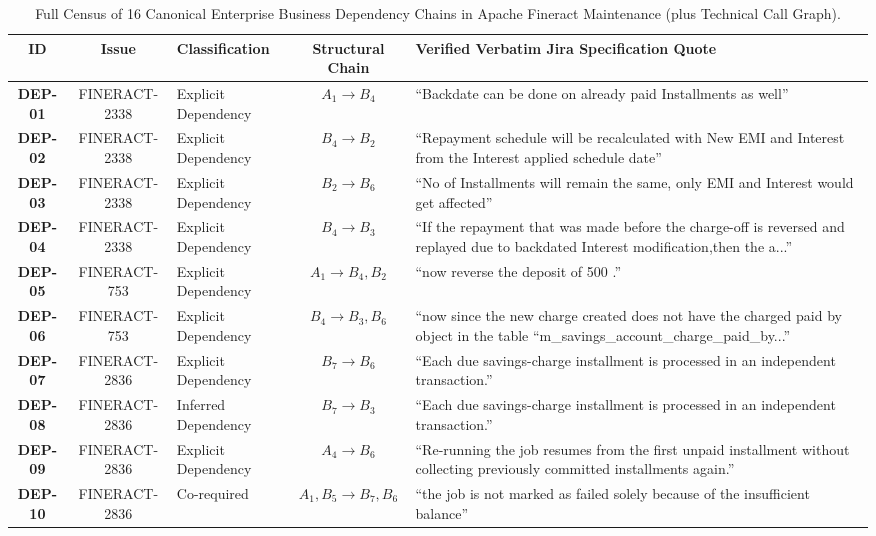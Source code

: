 \begin{table}[t]
\centering
\footnotesize
\caption{Full Census of 16 Canonical Enterprise Business Dependency Chains in Apache Fineract Maintenance (plus Technical Call Graph).}
\label{tab:fineract_dependencies_full}
\begin{tabularx}{\textwidth}{c c l c X}
\toprule
\textbf{ID} & \textbf{Issue} & \textbf{Classification} & \textbf{Structural Chain} & \textbf{Verified Verbatim Jira Specification Quote} \\
\midrule
\textbf{DEP-01} & FINERACT-2338 & Explicit Dependency & $A_1 \rightarrow B_4$ & ``Backdate can be done on already paid Installments as well'' \\
\textbf{DEP-02} & FINERACT-2338 & Explicit Dependency & $B_4 \rightarrow B_2$ & ``Repayment schedule will be recalculated with New EMI and Interest from the Interest applied schedule date'' \\
\textbf{DEP-03} & FINERACT-2338 & Explicit Dependency & $B_2 \rightarrow B_6$ & ``No of Installments will remain the same, only EMI and Interest would get affected'' \\
\textbf{DEP-04} & FINERACT-2338 & Explicit Dependency & $B_4 \rightarrow B_3$ & ``If the repayment that was made before the charge-off is reversed and replayed due to backdated Interest modification,then the a...'' \\
\textbf{DEP-05} & FINERACT-753 & Explicit Dependency & $A_1 \rightarrow B_4, B_2$ & ``now reverse the deposit of 500 .'' \\
\textbf{DEP-06} & FINERACT-753 & Explicit Dependency & $B_4 \rightarrow B_3, B_6$ & ``now since the new charge created does not have the charged paid by object in the table ``m\_savings\_account\_charge\_paid\_by...'' \\
\textbf{DEP-07} & FINERACT-2836 & Explicit Dependency & $B_7 \rightarrow B_6$ & ``Each due savings-charge installment is processed in an independent transaction.'' \\
\textbf{DEP-08} & FINERACT-2836 & Inferred Dependency & $B_7 \rightarrow B_3$ & ``Each due savings-charge installment is processed in an independent transaction.'' \\
\textbf{DEP-09} & FINERACT-2836 & Explicit Dependency & $A_4 \rightarrow B_6$ & ``Re-running the job resumes from the first unpaid installment without collecting previously committed installments again.'' \\
\textbf{DEP-10} & FINERACT-2836 & Co-required & $A_1, B_5 \rightarrow B_7, B_6$ & ``the job is not marked as failed solely because of the insufficient balance'' \\

\end{tabularx}
\end{table}
